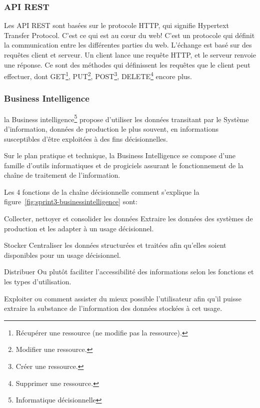 \subsubsection{API REST}

Les API REST sont basées sur le protocole HTTP, qui signifie Hypertext Transfer Protocol.
C’est ce qui est au cœur du web! C’est un protocole qui définit la communication
entre les différentes parties du web. L’échange est basé sur des requêtes client et serveur.
Un client lance une requête HTTP, et le serveur renvoie une réponse.
Ce sont des méthodes qui définissent les requêtes que le client peut effectuer,
dont GET\footnote{Récupérer une ressource (ne modifie pas la ressource).}, PUT\footnote{Modifier une ressource.},
POST\footnote{Créer une ressource.}, DELETE\footnote{Supprimer une ressource.} encore plus.

\subsubsection{Business Intelligence}

la Business intelligence\footnote{Informatique décisionnelle} propose d'utiliser
les données transitant par le Système
d'information, données de production le plus souvent, en informations susceptibles
d'être exploitées à des fins décisionnelles.

Sur le plan pratique et technique, la Business Intelligence se compose d'une famille
d'outils informatiques et
de progiciels assurant le fonctionnement de la chaîne de traitement de l'information.

Les 4 fonctions de la chaîne décisionnelle comment s'explique la figure~\ref{fig:sprint3-businessintelligence} sont:

\begin{description}[align=right,labelwidth=1cm]
 \item [1] Collecter, nettoyer et consolider les données Extraire les données
 des systèmes de production et les adapter à un usage décisionnel.
 \item [2] Stocker Centraliser les données structurées et traitées afin qu'elles
 soient disponibles pour un usage décisionnel.
 \item [3] Distribuer Ou plutôt faciliter l'accessibilité des informations selon
 les fonctions et les types d'utilisation.
 \item [4] Exploiter ou comment assister du mieux possible l'utilisateur afin qu'il puisse extraire
 la substance de l'information des données stockées à cet usage.
\end{description}


